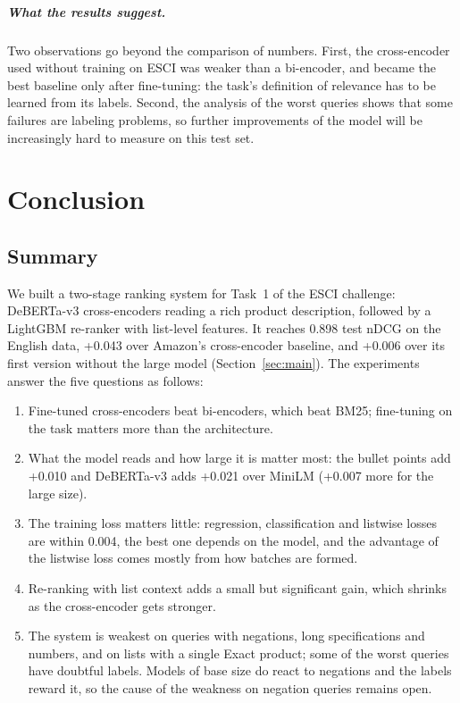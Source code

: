 \documentclass[12pt,a4paper]{report}
\begin{document}
\paragraph{What the results suggest.} Two observations go beyond the comparison of numbers. First, the cross-encoder used without training on ESCI was weaker than a bi-encoder, and became the best baseline only after fine-tuning: the task's definition of relevance has to be learned from its labels. Second, the analysis of the worst queries shows that some failures are labeling problems, so further improvements of the model will be increasingly hard to measure on this test set.

\chapter{Conclusion}\label{ch:conclusion}
\section{Summary}
We built a two-stage ranking system for Task~1 of the ESCI challenge: DeBERTa-v3 cross-encoders reading a rich product description, followed by a LightGBM re-ranker with list-level features. It reaches 0.898 test nDCG on the English data, +0.043 over Amazon's cross-encoder baseline, and +0.006 over its first version without the large model (Section~\ref{sec:main}). The experiments answer the five questions as follows:
\begin{enumerate}[label=\textbf{Q\arabic*}]
  \item Fine-tuned cross-encoders beat bi-encoders, which beat BM25; fine-tuning on the task matters more than the architecture.
  \item What the model reads and how large it is matter most: the bullet points add +0.010 and DeBERTa-v3 adds +0.021 over MiniLM (+0.007 more for the large size).
  \item The training loss matters little: regression, classification and listwise losses are within 0.004, the best one depends on the model, and the advantage of the listwise loss comes mostly from how batches are formed.
  \item Re-ranking with list context adds a small but significant gain, which shrinks as the cross-encoder gets stronger.
  \item The system is weakest on queries with negations, long specifications and numbers, and on lists with a single Exact product; some of the worst queries have doubtful labels. Models of base size do react to negations and the labels reward it, so the cause of the weakness on negation queries remains open.
\end{enumerate}
\end{document}
